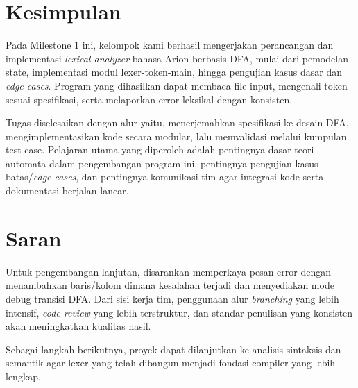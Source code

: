 \section{Kesimpulan}
Pada Milestone 1 ini, kelompok kami berhasil mengerjakan perancangan dan implementasi \textit{lexical analyzer} bahasa Arion berbasis DFA, mulai dari pemodelan state, implementasi modul lexer-token-main, hingga pengujian kasus dasar dan \textit{edge cases}. Program yang dihasilkan dapat membaca file input, mengenali token sesuai spesifikasi, serta melaporkan error leksikal dengan konsisten.

Tugas diselesaikan dengan alur yaitu, menerjemahkan spesifikasi ke desain DFA, mengimplementasikan kode secara modular, lalu memvalidasi melalui kumpulan test case. Pelajaran utama yang diperoleh adalah pentingnya dasar teori automata dalam pengembangan program ini, pentingnya pengujian kasus batas/\textit{edge cases}, dan pentingnya komunikasi tim agar integrasi kode serta dokumentasi berjalan lancar.

\section{Saran}

Untuk pengembangan lanjutan, disarankan memperkaya pesan error dengan menambahkan baris/kolom dimana kesalahan terjadi dan menyediakan mode debug transisi DFA. Dari sisi kerja tim, penggunaan alur \textit{branching} yang lebih intensif, \textit{code review} yang lebih terstruktur, dan standar penulisan yang konsisten akan meningkatkan kualitas hasil.

Sebagai langkah berikutnya, proyek dapat dilanjutkan ke analisis sintaksis dan semantik agar lexer yang telah dibangun menjadi fondasi compiler yang lebih lengkap.
